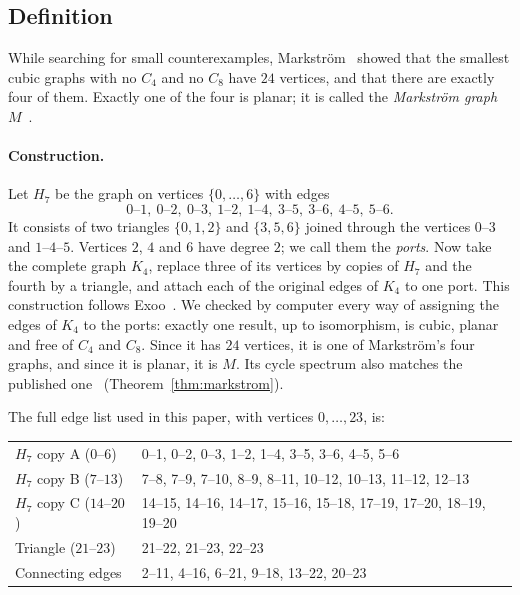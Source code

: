 \documentclass[11pt,a4paper]{article}
\theoremstyle{definition}
\newcommand{\C}[1]{C_{#1}}
\begin{document}
\subsection{Definition}

While searching for small counterexamples, Markstr\"om~\cite{markstrom}
showed that the smallest cubic graphs with no $\C4$ and no $\C8$ have $24$
vertices, and that there are exactly four of them. Exactly one of the four is
planar; it is called the \emph{Markstr\"om graph} $M$~\cite{mathworld}.

\paragraph{Construction.}
Let $H_7$ be the graph on vertices $\{0,\dots,6\}$ with edges
\[
  0\text{--}1,\ 0\text{--}2,\ 0\text{--}3,\ 1\text{--}2,\ 1\text{--}4,\ 3\text{--}5,\ 3\text{--}6,\ 4\text{--}5,\ 5\text{--}6 .
\]
It consists of two triangles $\{0,1,2\}$ and $\{3,5,6\}$ joined through the
vertices $0$--$3$ and $1$--$4$--$5$. Vertices $2$, $4$ and $6$ have degree
$2$; we call them the \emph{ports}. Now take the complete graph $K_4$, replace
three of its vertices by copies of $H_7$ and the fourth by a triangle, and
attach each of the original edges of $K_4$ to one port. This construction
follows Exoo~\cite{three-graphs}. We checked by computer every way of
assigning the edges of $K_4$ to the ports: exactly one result, up to
isomorphism, is cubic, planar and free of $\C4$ and $\C8$. Since it has $24$
vertices, it is one of Markstr\"om's four graphs, and since it is planar, it
is $M$. Its cycle spectrum also matches the published one~\cite{mathworld}
(Theorem~\ref{thm:markstrom}).

The full edge list used in this paper, with vertices $0,\dots,23$, is:
\begin{center}
\small
\begin{tabular}{ll}
\toprule
$H_7$ copy A ($0$--$6$) & 0--1, 0--2, 0--3, 1--2, 1--4, 3--5, 3--6, 4--5, 5--6\\
$H_7$ copy B ($7$--$13$) & 7--8, 7--9, 7--10, 8--9, 8--11, 10--12, 10--13, 11--12, 12--13\\
$H_7$ copy C ($14$--$20$) & 14--15, 14--16, 14--17, 15--16, 15--18, 17--19, 17--20, 18--19, 19--20\\
Triangle ($21$--$23$) & 21--22, 21--23, 22--23\\
Connecting edges & 2--11, 4--16, 6--21, 9--18, 13--22, 20--23\\
\bottomrule
\end{tabular}
\end{center}
\end{document}

